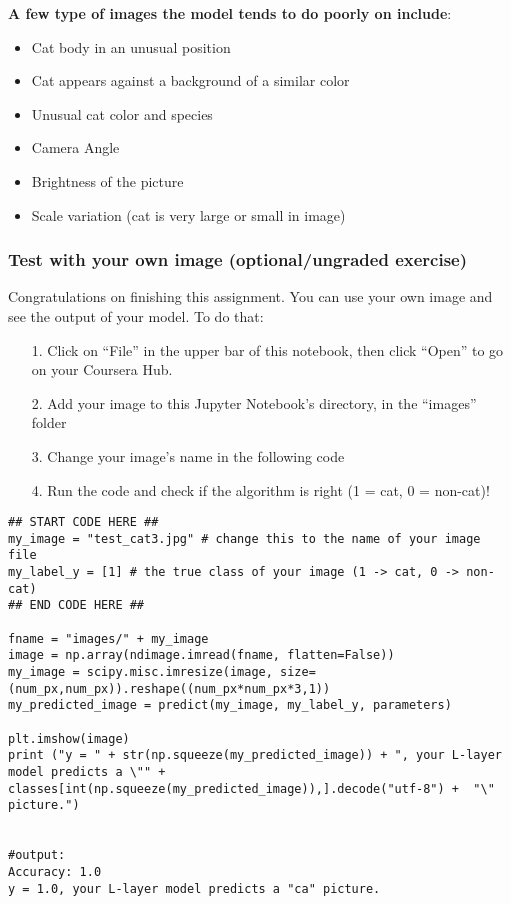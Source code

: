 {\textbf {A few type of images the model tends to do poorly on include}}:
\begin{itemize}
\item Cat body in an unusual position
\item Cat appears against a background of a similar color
\item Unusual cat color and species
\item Camera Angle
\item Brightness of the picture
\item Scale variation (cat is very large or small in image)
\end{itemize}



\subsubsection{Test with your own image (optional/ungraded exercise)}

Congratulations on finishing this assignment. You can use your own image and see the output of your model. To do that:
\begin{itemize}
\item[1.] Click on ``File'' in the upper bar of this notebook, then click ``Open'' to go on your Coursera Hub.
\item[2.] Add your image to this Jupyter Notebook's directory, in the ``images'' folder
\item[3.] Change your image's name in the following code
\item[4.] Run the code and check if the algorithm is right (1 = cat, 0 = non-cat)!
\end{itemize}

\begin{verbatim}
## START CODE HERE ##
my_image = "test_cat3.jpg" # change this to the name of your image file 
my_label_y = [1] # the true class of your image (1 -> cat, 0 -> non-cat)
## END CODE HERE ##

fname = "images/" + my_image
image = np.array(ndimage.imread(fname, flatten=False))
my_image = scipy.misc.imresize(image, size=(num_px,num_px)).reshape((num_px*num_px*3,1))
my_predicted_image = predict(my_image, my_label_y, parameters)

plt.imshow(image)
print ("y = " + str(np.squeeze(my_predicted_image)) + ", your L-layer model predicts a \"" + classes[int(np.squeeze(my_predicted_image)),].decode("utf-8") +  "\" picture.")


#output:
Accuracy: 1.0
y = 1.0, your L-layer model predicts a "ca" picture.
\end{verbatim}

